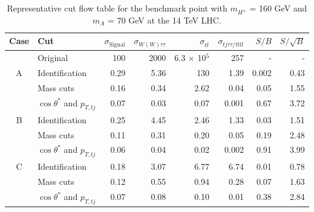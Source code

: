 \begin{table}
\centering
\strictpagecheck
\begin{adjustwidth*}{0in}{-1.1in}
\caption{Representative cut flow table for the benchmark point with $m_{H^{\pm}}$ = 160 GeV and $m_A$ = 70 GeV at the 14 TeV LHC.}
  \begin{tabular}{clrrrrrr}
    \toprule
 Case   & Cut                           & $\sigma_\text{Signal}$ & $\sigma_{W(W)\tau\tau}$ & $\sigma_{t\bar{t}}$ & $\sigma_{tj\tau\tau/ttll}$ & $S/B$ & $S/\sqrt{B}$\\\midrule
        &  Original                             & 100                    & 2000                    & 6.3 $\times$ 10$^5$ & 257                        & -     & -	\\\midrule
    A   & Identification                & 0.29                   & 5.36                    & 130                 & 1.39                       & 0.002 & 0.43	\\
        & Mass cuts                     & 0.16                   & 0.34                    & 2.62                & 0.04                       & 0.05  & 1.55	\\
        & $\cos\theta^*$ and $p_{T,tj}$ & 0.07                   & 0.03                    & 0.07                & 0.001                      & 0.67  & 3.72	\\\midrule
    B   & Identification                & 0.25                   & 4.45                    & 2.46                & 1.33                       & 0.03  & 1.51	\\
        & Mass cuts                     & 0.11                   & 0.31                    & 0.20                & 0.05                       & 0.19  & 2.48	\\
        & $\cos\theta^*$ and $p_{T,tj}$ & 0.06                   & 0.04                    & 0.02                & 0.002                      & 0.91  & 3.99	\\\midrule
    C   & Identification                & 0.18                   & 3.07                    & 6.77                & 6.74                       & 0.01  & 0.78 \\
        & Mass cuts                     & 0.12                   & 0.55                    & 0.94                & 0.28                       & 0.07  & 1.63 \\
        & $\cos\theta^*$ and $p_{T,tj}$ & 0.07                   & 0.08                    & 0.10                & 0.01                       & 0.38  & 2.84 \\
\bottomrule
\end{tabular}
\label{tab:tj}
\end{adjustwidth*}
\end{table}

